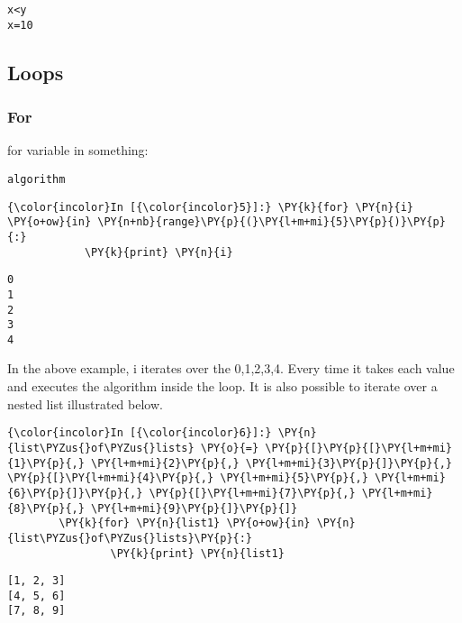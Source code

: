     \begin{Verbatim}[commandchars=\\\{\}]
x<y
x=10
    \end{Verbatim}

    \subsection{Loops}\label{loops}

    \subsubsection{For}\label{for}

    for variable in something:

\begin{verbatim}
algorithm
\end{verbatim}

    \begin{Verbatim}[commandchars=\\\{\}]
{\color{incolor}In [{\color{incolor}5}]:} \PY{k}{for} \PY{n}{i} \PY{o+ow}{in} \PY{n+nb}{range}\PY{p}{(}\PY{l+m+mi}{5}\PY{p}{)}\PY{p}{:}
            \PY{k}{print} \PY{n}{i}
\end{Verbatim}

    \begin{Verbatim}[commandchars=\\\{\}]
0
1
2
3
4
    \end{Verbatim}

    In the above example, i iterates over the 0,1,2,3,4. Every time it takes
each value and executes the algorithm inside the loop. It is also
possible to iterate over a nested list illustrated below.

    \begin{Verbatim}[commandchars=\\\{\}]
{\color{incolor}In [{\color{incolor}6}]:} \PY{n}{list\PYZus{}of\PYZus{}lists} \PY{o}{=} \PY{p}{[}\PY{p}{[}\PY{l+m+mi}{1}\PY{p}{,} \PY{l+m+mi}{2}\PY{p}{,} \PY{l+m+mi}{3}\PY{p}{]}\PY{p}{,} \PY{p}{[}\PY{l+m+mi}{4}\PY{p}{,} \PY{l+m+mi}{5}\PY{p}{,} \PY{l+m+mi}{6}\PY{p}{]}\PY{p}{,} \PY{p}{[}\PY{l+m+mi}{7}\PY{p}{,} \PY{l+m+mi}{8}\PY{p}{,} \PY{l+m+mi}{9}\PY{p}{]}\PY{p}{]}
        \PY{k}{for} \PY{n}{list1} \PY{o+ow}{in} \PY{n}{list\PYZus{}of\PYZus{}lists}\PY{p}{:}
                \PY{k}{print} \PY{n}{list1}
\end{Verbatim}

    \begin{Verbatim}[commandchars=\\\{\}]
[1, 2, 3]
[4, 5, 6]
[7, 8, 9]
    \end{Verbatim}

